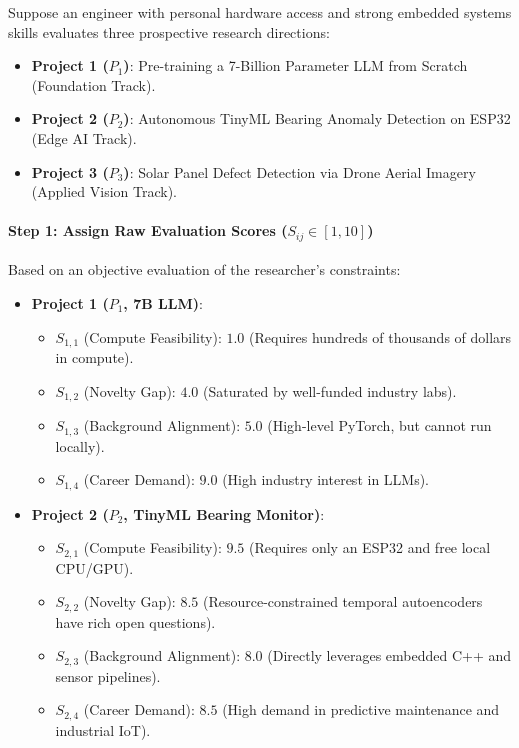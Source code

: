 \begin{example}
Suppose an engineer with personal hardware access and strong embedded systems skills evaluates three prospective research directions:
\begin{itemize}
    \item \textbf{Project 1 ($P_1$)}: Pre-training a 7-Billion Parameter LLM from Scratch (Foundation Track).
    \item \textbf{Project 2 ($P_2$)}: Autonomous TinyML Bearing Anomaly Detection on ESP32 (Edge AI Track).
    \item \textbf{Project 3 ($P_3$)}: Solar Panel Defect Detection via Drone Aerial Imagery (Applied Vision Track).
\end{itemize}

\paragraph{Step 1: Assign Raw Evaluation Scores ($S_{ij} \in [1, 10]$)}
Based on an objective evaluation of the researcher's constraints:
\begin{itemize}
    \item \textbf{Project 1 ($P_1$, 7B LLM)}:
    \begin{itemize}
        \item $S_{1,1}$ (Compute Feasibility): $1.0$ (Requires hundreds of thousands of dollars in compute).
        \item $S_{1,2}$ (Novelty Gap): $4.0$ (Saturated by well-funded industry labs).
        \item $S_{1,3}$ (Background Alignment): $5.0$ (High-level PyTorch, but cannot run locally).
        \item $S_{1,4}$ (Career Demand): $9.0$ (High industry interest in LLMs).
    \end{itemize}
    \item \textbf{Project 2 ($P_2$, TinyML Bearing Monitor)}:
    \begin{itemize}
        \item $S_{2,1}$ (Compute Feasibility): $9.5$ (Requires only an ESP32 and free local CPU/GPU).
        \item $S_{2,2}$ (Novelty Gap): $8.5$ (Resource-constrained temporal autoencoders have rich open questions).
        \item $S_{2,3}$ (Background Alignment): $8.0$ (Directly leverages embedded C++ and sensor pipelines).
        \item $S_{2,4}$ (Career Demand): $8.5$ (High demand in predictive maintenance and industrial IoT).

\end{itemize}
\end{itemize}
\end{example}
